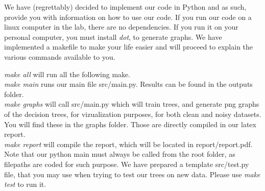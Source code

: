 We have (regrettably) decided to implement our code in Python and as such, provide you with information on how to use our code.
If you run our code on a linux computer in the lab, there are no dependencies. If you run it on your personal computer, you must install \emph{dot}, to generate graphs.
We have implemented a makefile to make your life easier and will proceed to explain the various commands available to you.

\emph{make all} will run all the following make.\\
\emph{make main} runs our main file  src/main.py. Results can be found in the  outputs folder.\\
\emph{make graphs} will call  src/main.py which will train trees, and generate png graphs of the decision trees, for vizualization purposes,
for both clean and noisy datasets. You will find these in the  graphs folder.
Those are directly compiled in our latex report.\\
\emph{make report} will compile the report, which will be located in report/report.pdf.\\

Note that our python main must always be called from the root folder, as filepaths are coded for such purpose.
We have prepared a template  src/test.py file, that you may use when
trying to test our trees on new data.
Please use  \emph{make test} to run it.




